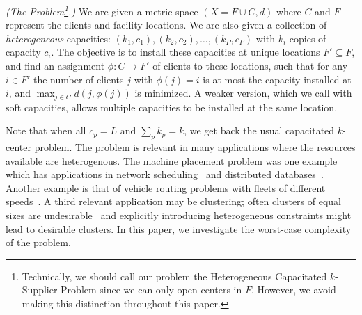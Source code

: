 \begin{definition}\emph{(The \mckc Problem\footnote{Technically, we should call our problem the Heterogeneous Capacitated $k$-Supplier Problem since we can only open centers in $F$. However, we avoid making this distinction throughout this paper.}.)}
	We are given a metric space $(X = F\cup C,d)$  where $C$ and $F$ represent the clients and facility locations.%
	We are also given a collection of {\em heterogeneous} capacities: $(k_1,c_1), (k_2,c_2),\ldots, (k_P,c_P)$ with $k_i$ copies of capacity $c_i$.
	The objective is to install these capacities at unique locations $F'\subseteq F$, and find an assignment $\phi:C\to F'$ of clients to these locations,
	such that for any $i\in F'$ the number of clients $j$ with $\phi(j) = i$ is at most the capacity installed at $i$, and $\max_{j\in C} d(j,\phi(j))$ is minimized.
	A weaker version, which we call \mckc  with soft capacities, allows multiple capacities to be installed at the same location.
\end{definition}
\noindent
Note that when all $c_p = L$ and $\sum_p k_p = k$, we get back the usual capacitated $k$-center problem.
The \mckc problem is relevant in many applications where the resources available are heterogenous. The machine placement problem was one example which has applications in network scheduling~\cite{QiuSZ15,ImM15a} and distributed databases~\cite{MorganL77,SKRN15}. Another example is that of  vehicle routing problems with  fleets of different speeds~\cite{GortzMN016}. A third relevant application may be clustering; often clusters of equal sizes are undesirable~\cite{GuhaRS01} and explicitly introducing heterogeneous constraints might lead to desirable clusters.
In this paper, we investigate the worst-case complexity of the \mckc problem. %

